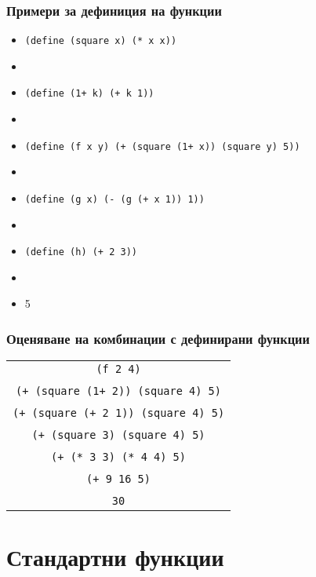 \documentclass{beamer}
\begin{document}
\begin{frame}
  \frametitle{Примери за дефиниция на функции}

  \begin{itemize}[<+->]
  \item \tt{(define (square x) (* x x))}
  \item {}
  \item \tt{(define (1+ k) (+ k 1))}
  \item {}
  \item \tt{(define (f x y) (+ (square (1+ x)) (square y) 5))}
  \item {}
  \item \tt{(define (g x) (- (g (+ x 1)) 1))}
  \item {}
  \item \tt{(define (h) (+ 2 3))}
  \item {}
  \item {}5
  \end{itemize}

\end{frame}

\begin{frame}
  \frametitle{Оценяване на комбинации с дефинирани функции}
  \begin{center}
    \begin{tabular}{c}
      \tt{(f 2 4)}\\
      \pause\nxt{\bda\\
      \tt{(+ (square (1+ 2)) (square 4) 5)}\\
      \nxt{\bda\\
      \tt{(+ (square (+ 2 1)) (square 4) 5)}\\
      \nxt{\bda\\
      \tt{(+ (square 3) (square 4) 5)}\\
      \nxt{\bda\\
      \tt{(+ (* 3 3) (* 4 4) 5)}\\
      \nxt{\bda\\
      \tt{(+ 9 16 5)}\\
      \nxt{\bda\\
      \tt{30}}}}}}}
    \end{tabular}
  \end{center}
\end{frame}

\section{Стандартни функции}
\end{document}
